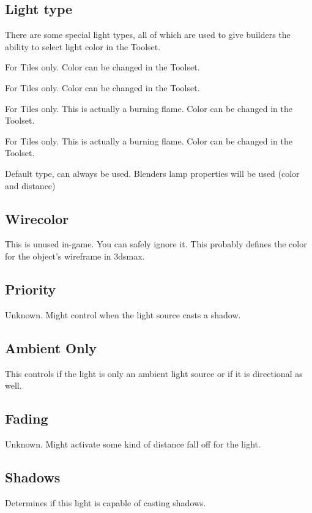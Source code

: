 \subsection*{Light type}
There are some special light types, all of which are used to give builders
the ability to select light color in the Toolset.
\begin{description}[leftmargin=8em,style=nextline]
    \item[Mainlight 1] For Tiles only. Color can be changed in the Toolset.
    \item[Mainlight 2] For Tiles only. Color can be changed in the Toolset.
    \item[Sourcelight 1] For Tiles only. This is actually a burning flame. Color can be changed in the Toolset.
    \item[Sourcelight 2] For Tiles only. This is actually a burning flame. Color can be changed in the Toolset.
    \item[Default] Default type, can always be used. Blenders lamp properties will be used (color and distance)
\end{description}

\subsection*{Wirecolor}
This is unused in-game. You can safely ignore it. This probably defines the
color for the object's wireframe in 3dsmax.

\subsection*{Priority}
Unknown. Might control when the light source casts a shadow.

\subsection*{Ambient Only}
This controls if the light is only an ambient light source or
if it is directional as well.

\subsection*{Fading}
Unknown. Might activate some kind of distance fall off for the light.

\subsection*{Shadows}
Determines if this light is capable of casting shadows.

